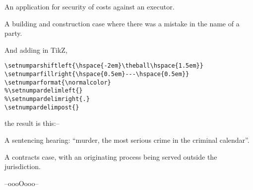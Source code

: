 \setnumparshiftleft{}
\setnumparfillright{\hspace{3pt}--\hspace{3pt}}
\setnumparformat{\color{red}}
\setnumpardelimleft{[}
\setnumpardelimright{]}
\p An application for security of costs against an executor.

\p A building and construction case where there was a mistake in the name of a party.
\bigskip

And adding in TikZ, 
\begin{verbatim}
\setnumparshiftleft{\hspace{-2em}\theball\hspace{1.5em}}
\setnumparfillright{\hspace{0.5em}---\hspace{0.5em}}
\setnumparformat{\normalcolor}
%\setnumpardelimleft{}
%\setnumpardelimright{.}
\setnumpardelimpost{}
\end{verbatim}
\bigskip

\noindent the result is this:--
\bigskip


\setnumparshiftleft{\hspace{-2em}\theball\hspace{1.5em}}
\setnumparfillright{\hspace{0.5em}---\hspace{0.5em}}
\setnumparformat{\normalcolor}
\setnumpardelimpost{}
\p A sentencing hearing: ``murder, the most serious crime in the criminal calendar''.

\p A contracts case, with an originating process being served outside the jurisdiction.


\bigskip
\bigskip
\hfill --oooOooo--\hfill\ 
\printbibliography[nottype=case,
nottype=statute]
\let\twocolumn\xoldtwocolumn
\printindex[general]



